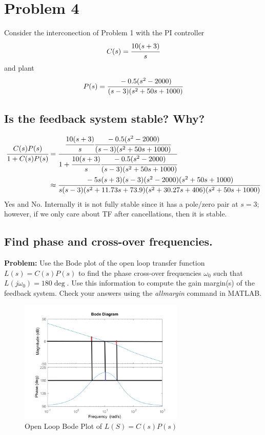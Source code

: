 \documentclass[letter]{article}
\numberwithin{equation}{section}
\begin{document}
\newpage
\section{Problem 4}
Consider the interconection of Problem 1 with the PI controller\[
	C(s) = \cfrac{10 (s+3)}{s}
\] and plant \[
	P(s) = \cfrac{-0.5(s^2 - 2000)}{(s-3)(s^2 + 50s + 1000)}
\]

\subsection{Is the feedback system stable? Why?}
\begin{align*}
	\cfrac{C(s) P(s)} {1 + C(s) P(s)}
		&= \cfrac{
			\cfrac{10 (s+3)}{s} \cfrac{-0.5(s^2 - 2000)}{(s-3)(s^2 + 50s + 1000)}
		}{
			1 + \cfrac{10 (s+3)}{s} \cfrac{-0.5(s^2 - 2000)}{(s-3)(s^2 + 50s + 1000)}
		}\\
		&\approx \cfrac{
			-5 s (s+3) (s-3) (s^2 - 2000) (s^2 + 50s + 1000)
		}{
			s (s-3) (s^2 + 11.73s + 73.9) (s^2 + 30.27s + 406) (s^2 + 50s + 1000)
		}
\end{align*}
Yes and No. 
Internally it is not fully stable since it has a pole/zero pair at $s=3$;
however, if we only care about TF after cancellations, then it is stable.

\subsection{Find phase and cross-over frequencies.}

\textbf{Problem:}
Use the Bode plot of the open loop transfer function $L(s) = C(s)P(s)$ to find the phase cross-over frequencies $\omega_0$ such that $L(j\omega_0) = 180\deg$. 
Use this information to compute the gain margin(s) of the feedback system. 
Check your answers using the \emph{allmargin} command in MATLAB.

\begin{figure}[ht]\label{fig:pblm4b}
	\centering
	\includegraphics[width=0.7\textwidth]{figs/pblm4_L_bode.png}
	\caption{Open Loop Bode Plot of $L(S) = C(s) P(s)$}
\end{figure}
\end{document}
